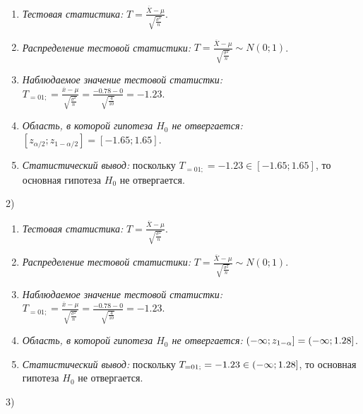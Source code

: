 \begin{enumerate}
\item  \textit{Тестовая статистика:} $T=\frac{\overline{X}-\mu }{\sqrt{{\tfrac{\sigma ^{2} }{n}} } } $.

\item  \textit{Распределение тестовой статистики:} $T=\frac{\overline{X}-\mu }{\sqrt{{\tfrac{\sigma ^{2} }{n}} } } \sim N\left(0;1\right)$.

\item  \textit{Наблюдаемое значение тестовой статистки:} $T_{=01;} =\frac{\overline{x}-\mu }{\sqrt{{\tfrac{\sigma ^{2} }{n}} } } =\frac{-0.78-0}{\sqrt{{\tfrac{4}{10}} } } =-1.23$.

\item  \textit{Область, в которой гипотеза $H_{0} $ не отвергается:} $\left[z_{\alpha /2} ;z_{1-\alpha /2} \right]=\left[-1.65;1.65\right]$.

\item  \textit{Статистический вывод:} поскольку $T_{=01;} =-1.23\in \left[-1.65;1.65\right]$, то основная гипотеза $H_{0} $ не отвергается.
\end{enumerate}



2) 

\begin{enumerate}
\item  \textit{Тестовая статистика:} $T=\frac{\overline{X}-\mu }{\sqrt{{\tfrac{\sigma ^{2} }{n}} } } $.

\item  \textit{Распределение тестовой статистики:} $T=\frac{\overline{X}-\mu }{\sqrt{{\tfrac{\sigma ^{2} }{n}} } } \sim N\left(0;1\right)$.

\item  \textit{Наблюдаемое значение тестовой статистки:} $T_{=01;} =\frac{\overline{x}-\mu }{\sqrt{{\tfrac{\sigma ^{2} }{n}} } } =\frac{-0.78-0}{\sqrt{{\tfrac{4}{10}} } } =-1.23$.

\item  \textit{Область, в которой гипотеза $H_{0} $ не отвергается:} $\left(-\infty ;z_{1-\alpha } \right]=\left(-\infty ;{\rm 1.28}\right]$.

\item  \textit{Статистический вывод:} поскольку $T_{=01;} =-1.23\in \left(-\infty ;{\rm 1.28}\right]$, то основная гипотеза $H_{0} $ не отвергается.
\end{enumerate}



3) 

